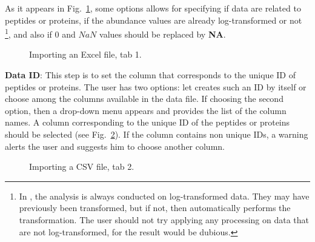 \documentclass[12pt]{article}
\begin{document}
As it appears in Fig.~\ref{fig:imp1}, some options allows for 
specifying if data are related to peptides or proteins, if the abundance values
are already log-transformed or not \footnote{In , the analysis is 
always conducted on log-transformed data. They may have previously been 
transformed, but if not, then  automatically performs the transformation. 
The user should not try applying any  processing on data that are not 
log-transformed, for the result would be dubious.}, and also if $0$ and $NaN$ 
values should be replaced by \textbf{NA}. 
\begin {figure}
\centering
{}
\caption{Importing an Excel file, tab 1.}\label{fig:imp1}
\end {figure}

{\textbf {Data ID}: This step is to set the column that corresponds to the 
unique ID of peptides or proteins. The user has two options: let  
creates such an ID by itself or choose among the columns available in the 
data file. If choosing the second option, then a drop-down menu appears and 
provides the list of the column names. A column corresponding to the unique 
ID of the peptides or proteins should be selected (see Fig.~\ref{fig:imp2}). 
If the column contains non unique IDs, a warning alerts the user and suggests 
him to choose another column.}
\begin {figure}
\centering
{}
\caption{Importing a CSV file, tab 2.}\label{fig:imp2}
\end {figure}
\end{document}
